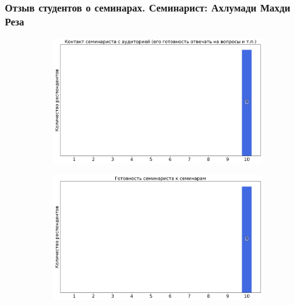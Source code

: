     \subsubsection{Отзыв студентов о семинарах. Семинарист: Ахлумади Махди Реза}
        \begin{figure}[H]
            \centering
            \begin{subfigure}[b]{0.45\textwidth}
                \centering
                \includegraphics[width=\textwidth]{images/2 course/Аналитическая механика/seminarists-marks-Ахлумади Махди Реза-0.png}
            \end{subfigure}
            \begin{subfigure}[b]{0.45\textwidth}
                \centering
                \includegraphics[width=\textwidth]{images/2 course/Аналитическая механика/seminarists-marks-Ахлумади Махди Реза-1.png}
            \end{subfigure}
            \begin{subfigure}[b]{0.45\textwidth}
                \centering

\end{subfigure}
\end{figure}
